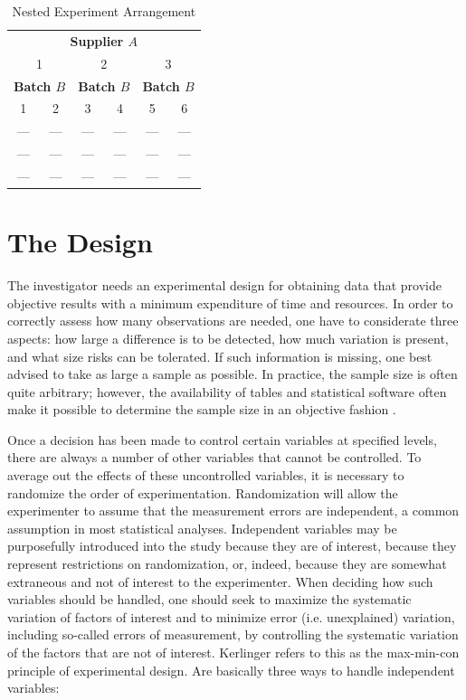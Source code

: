 \documentclass{WileySev}
\begin{document}
\begin{table}[h]
\caption{Nested Experiment Arrangement}
\centering
\begin{tabular}{ cccccc }
\hline
\multicolumn{6}{c}{\textbf{Supplier $A$}} \\
\multicolumn{2}{c}{1} & \multicolumn{2}{c}{2} & \multicolumn{2}{c}{3} \\
\hline
\multicolumn{2}{c}{\textbf{Batch $B$}} & \multicolumn{2}{c}{\textbf{Batch $B$}} & \multicolumn{2}{c}{\textbf{Batch $B$}} \\
1 & 2 & 3 & 4 & 5 & 6 \\
\hline
--- & --- & --- & --- & --- & --- \\
--- & --- & --- & --- & --- & --- \\
--- & --- & --- & --- & --- & --- \\
\hline
\end{tabular}
\label{tab:nested_array}
\end{table}

\section{The Design}

The investigator needs an experimental design for obtaining data that provide objective results with a minimum expenditure of time and resources. In order to correctly assess how many observations are needed, one have to considerate three aspects: how large a difference is to be detected, how much variation is present, and what size risks can be tolerated. If such information is missing, one best advised to take as large a sample as possible. In practice, the sample size is often quite arbitrary; however, the availability of tables and statistical software often make it possible to determine the sample size in an objective fashion \cite{hicks1999fundamental}.

Once a decision has been made to control certain variables at specified levels, there are always a number of other variables that cannot be controlled. To average out the effects of these uncontrolled variables, it is necessary to randomize the order of experimentation. Randomization will allow the experimenter to assume that the measurement errors are independent, a common assumption in most statistical analyses. Independent variables may be purposefully introduced into the study because they are of interest, because they represent restrictions on randomization, or, indeed, because they are somewhat extraneous and not of interest to the experimenter. When deciding how such variables should be handled, one should seek to maximize the systematic variation of factors of interest and to minimize error (i.e. unexplained) variation, including so-called errors of measurement, by controlling the systematic variation of the factors that are not of interest. Kerlinger refers to this as the max-min-con principle of experimental design. Are basically three ways to handle independent variables:
\end{document}
